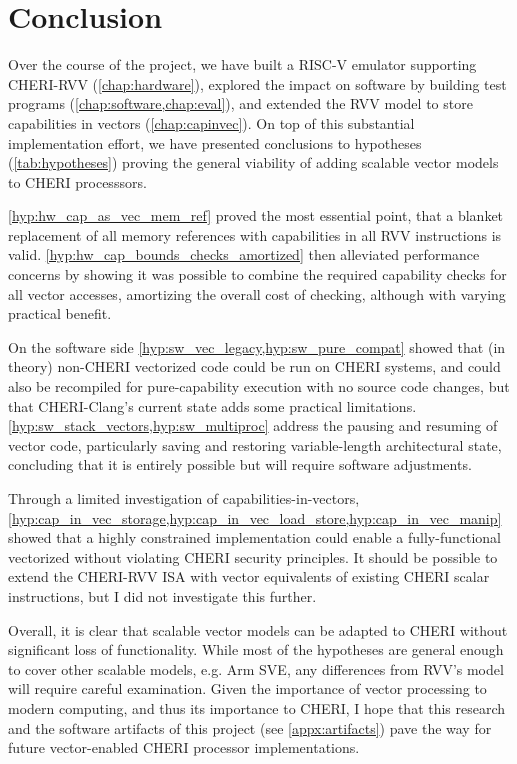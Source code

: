 \documentclass[../thesis]{subfiles}
\begin{document}
\chapter{Conclusion}
Over the course of the project, we have built a RISC-V emulator supporting CHERI-RVV (\cref{chap:hardware}), explored the impact on software by building test programs (\cref{chap:software,chap:eval}), and extended the RVV model to store capabilities in vectors (\cref{chap:capinvec}).
On top of this substantial implementation effort, we have presented conclusions to hypotheses (\cref{tab:hypotheses}) proving the general viability of adding scalable vector models to CHERI processsors.

\cref{hyp:hw_cap_as_vec_mem_ref} proved the most essential point, that a blanket replacement of all memory references with capabilities in all RVV instructions is valid.
\cref{hyp:hw_cap_bounds_checks_amortized} then alleviated performance concerns by showing it was possible to combine the required capability checks for all vector accesses, amortizing the overall cost of checking, although with varying practical benefit.

On the software side \cref{hyp:sw_vec_legacy,hyp:sw_pure_compat} showed that (in theory) non-CHERI vectorized code could be run on CHERI systems, and could also be recompiled for pure-capability execution with no source code changes, but that CHERI-Clang's current state adds some practical limitations.
\cref{hyp:sw_stack_vectors,hyp:sw_multiproc} address the pausing and resuming of vector code, particularly saving and restoring variable-length architectural state, concluding that it is entirely possible but will require software adjustments.

Through a limited investigation of capabilities-in-vectors, \cref{hyp:cap_in_vec_storage,hyp:cap_in_vec_load_store,hyp:cap_in_vec_manip} showed that a highly constrained implementation could enable a fully-functional vectorized  without violating CHERI security principles.
It should be possible to extend the CHERI-RVV ISA with vector equivalents of existing CHERI scalar instructions, but I did not investigate this further.

Overall, it is clear that scalable vector models can be adapted to CHERI without significant loss of functionality.
While most of the hypotheses are general enough to cover other scalable models, e.g. Arm SVE, any differences from RVV's model will require careful examination.
Given the importance of vector processing to modern computing, and thus its importance to CHERI, I hope that this research and the software artifacts of this project (see \cref{appx:artifacts}) pave the way for future vector-enabled CHERI processor implementations.
\end{document}
